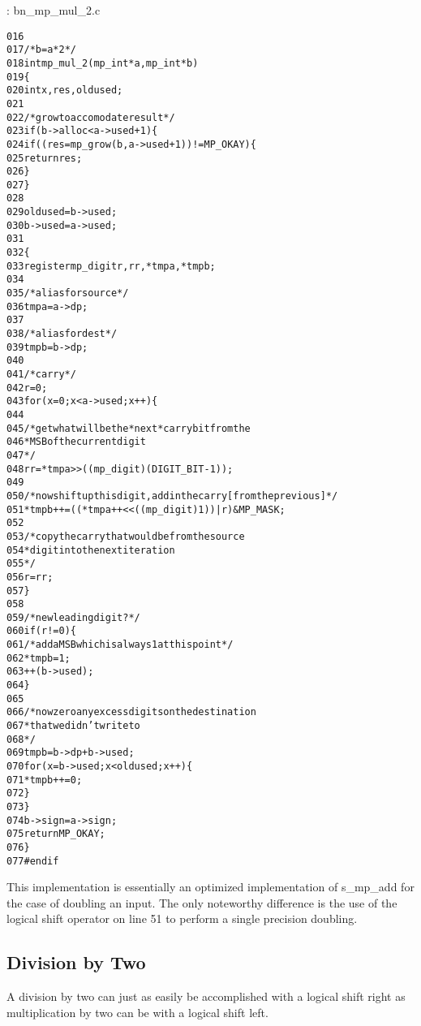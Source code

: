\documentclass[b5paper]{book}
\begin{document}
\vspace{+3mm}\begin{small}
\hspace{-5.1mm}{\bf File}: bn\_mp\_mul\_2.c
\vspace{-3mm}
\begin{alltt}
016   
017   /* b = a*2 */
018   int mp_mul_2(mp_int * a, mp_int * b)
019   \{
020     int     x, res, oldused;
021   
022     /* grow to accomodate result */
023     if (b->alloc < a->used + 1) \{
024       if ((res = mp_grow (b, a->used + 1)) != MP_OKAY) \{
025         return res;
026       \}
027     \}
028   
029     oldused = b->used;
030     b->used = a->used;
031   
032     \{
033       register mp_digit r, rr, *tmpa, *tmpb;
034   
035       /* alias for source */
036       tmpa = a->dp;
037       
038       /* alias for dest */
039       tmpb = b->dp;
040   
041       /* carry */
042       r = 0;
043       for (x = 0; x < a->used; x++) \{
044       
045         /* get what will be the *next* carry bit from the 
046          * MSB of the current digit 
047          */
048         rr = *tmpa >> ((mp_digit)(DIGIT_BIT - 1));
049         
050         /* now shift up this digit, add in the carry [from the previous] */
051         *tmpb++ = ((*tmpa++ << ((mp_digit)1)) | r) & MP_MASK;
052         
053         /* copy the carry that would be from the source 
054          * digit into the next iteration 
055          */
056         r = rr;
057       \}
058   
059       /* new leading digit? */
060       if (r != 0) \{
061         /* add a MSB which is always 1 at this point */
062         *tmpb = 1;
063         ++(b->used);
064       \}
065   
066       /* now zero any excess digits on the destination 
067        * that we didn't write to 
068        */
069       tmpb = b->dp + b->used;
070       for (x = b->used; x < oldused; x++) \{
071         *tmpb++ = 0;
072       \}
073     \}
074     b->sign = a->sign;
075     return MP_OKAY;
076   \}
077   #endif
\end{alltt}
\end{small}

This implementation is essentially an optimized implementation of s\_mp\_add for the case of doubling an input.  The only noteworthy difference
is the use of the logical shift operator on line 51 to perform a single precision doubling.  

\subsection{Division by Two}
A division by two can just as easily be accomplished with a logical shift right as multiplication by two can be with a logical shift left.
\end{document}
